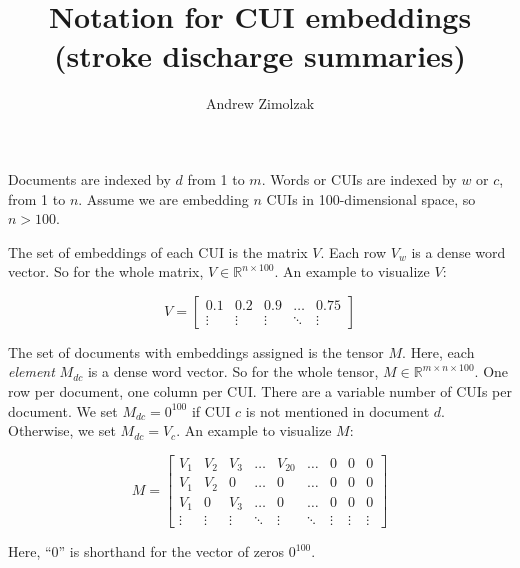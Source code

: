 \documentclass{article}
\title{Notation for CUI embeddings (stroke discharge summaries)}
\author{Andrew Zimolzak}
\begin{document}
\maketitle

Documents are indexed by $d$ from 1 to $m$. Words or CUIs are indexed
by $w$ or $c$, from 1 to $n$. Assume we are embedding $n$ CUIs in
100-dimensional space, so $n > 100$.

The set of embeddings of each CUI is the matrix $V$. Each row $V_w$ is
a dense word vector. So for the whole matrix, $V \in \mathbb{R}^{n
  \times 100}$. An example to visualize $V$:

\begin{equation}
  V = \left[
      \begin{array}{ccccc}
        0.1 & 0.2 & 0.9 & \ldots & 0.75 \\
        \vdots & \vdots & \vdots & \ddots & \vdots
      \end{array} \right]
\end{equation}

The set of documents with embeddings assigned is the tensor $M$. Here,
each \emph{element} $M_{dc}$ is a dense word vector. So for the whole
tensor, $M \in \mathbb{R}^{m \times n \times 100}$. One row per
document, one column per CUI. There are a variable number of CUIs per
document. We set $M_{dc} = 0^{100}$ if CUI $c$ is not mentioned in
document $d$. Otherwise, we set $M_{dc} = V_c$. An example to
visualize $M$:

\begin{equation}
  M = \left[
      \begin{array}{ccccccccc}
        V_1 & V_2 & V_3 & \ldots & V_{20} & \ldots & 0 & 0 & 0 \\
        V_1 & V_2 & 0   & \ldots & 0      & \ldots & 0 & 0 & 0 \\
        V_1 & 0   & V_3 & \ldots & 0      & \ldots & 0 & 0 & 0 \\
        \vdots & \vdots & \vdots & \ddots & \vdots & \ddots & \vdots & \vdots & \vdots
      \end{array} \right]
\end{equation}

Here, ``0'' is shorthand for the vector of zeros $0^{100}$.
\end{document}

